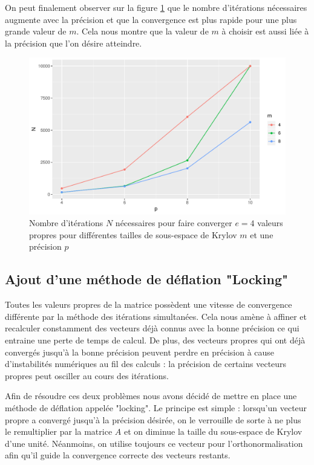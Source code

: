 \documentclass[11pt,a4paper]{article}
\begin{document}
		On peut finalement observer sur la figure \ref{fig:Nvsp-m_e4} que le nombre d'itérations nécessaires augmente avec la précision et que la convergence est plus rapide pour une plus grande valeur de $m$. Cela nous montre que la valeur de $m$ à choisir est aussi liée à la précision que l'on désire atteindre.

		\begin{figure}
			\centering
			\includegraphics[width=0.8\linewidth, keepaspectratio]{plots/Nvsp-m_e4.pdf}
			\caption{Nombre d'itérations $N$ nécessaires pour faire converger $e = 4$ valeurs propres pour différentes tailles de sous-espace de Krylov $m$ et une précision $p$ \label{fig:Nvsp-m_e4}}
		\end{figure}


	\subsection{Ajout d'une méthode de déflation "Locking"}
		Toutes les valeurs propres de la matrice possèdent une vitesse de convergence différente par la méthode des itérations simultanées. Cela nous amène à affiner et recalculer constamment des vecteurs déjà connus avec la bonne précision ce qui entraine une perte de temps de calcul. De plus, des vecteurs propres qui ont déjà convergés jusqu'à la bonne précision peuvent perdre en précision à cause d'instabilités numériques au fil des calculs : la précision de certains vecteurs propres peut osciller au cours des itérations.

		Afin de résoudre ces deux problèmes nous avons décidé de mettre en place une méthode de déflation appelée "locking". Le principe est simple : lorsqu'un vecteur propre a convergé jusqu'à la précision désirée, on le verrouille de sorte à ne plus le remultiplier par la matrice $A$ et on diminue la taille du sous-espace de Krylov d'une unité. Néanmoins, on utilise toujours ce vecteur pour l'orthonormalisation afin qu'il guide la convergence correcte des vecteurs restants.
\end{document}
